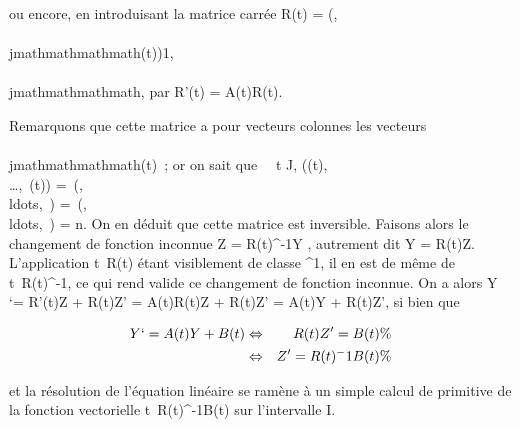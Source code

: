 ou encore, en introduisant la matrice carrée R(t) =
(\psii,\\\\jmathmathmathmath(t))1\leqi,\\\\jmathmathmathmath\leqn, par R'(t) = A(t)R(t).

Remarquons que cette matrice a pour vecteurs colonnes les vecteurs
\Phi\\\\jmathmathmathmath(t)~; or on sait que \forall~~t \in J,
\mathrmrg((t),\\\ldots,\Phin~(t))
=\
\mathrmrg(,\\ldots,\Phin~)
=\
\mathrmrg(,\\ldots,\phin~)
= n. On en déduit que cette matrice est inversible. Faisons alors le
changement de fonction inconnue Z = R(t)^-1Y , autrement dit
Y = R(t)Z. L'application t\mapsto~R(t) étant
visiblement de classe \mathcal{C}^1, il en est de même de
t\mapsto~R(t)^-1, ce qui rend valide ce
changement de fonction inconnue. On a alors Y `= R'(t)Z + R(t)Z' =
A(t)R(t)Z + R(t)Z' = A(t)Y + R(t)Z', si bien que

\begin{align*} Y `= A(t)Y + B(t)&
\Leftrightarrow & R(t)Z' = B(t) \%&
\\ & \Leftrightarrow & Z' =
R(t)^-1B(t)\%& \\
\end{align*}

et la résolution de l'équation linéaire se ramène à un simple calcul de
primitive de la fonction vectorielle
t\mapsto~R(t)^-1B(t) sur l'intervalle I.

